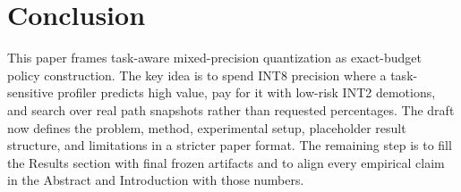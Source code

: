 \documentclass{article}
\newcommand{\inttwo}{INT2}
\newcommand{\inteight}{INT8}
\begin{document}
\section{Conclusion}

This paper frames task-aware mixed-precision quantization as exact-budget policy construction. The key idea is to spend \inteight{} precision where a task-sensitive profiler predicts high value, pay for it with low-risk \inttwo{} demotions, and search over real path snapshots rather than requested percentages. The draft now defines the problem, method, experimental setup, placeholder result structure, and limitations in a stricter paper format. The remaining step is to fill the Results section with final frozen artifacts and to align every empirical claim in the Abstract and Introduction with those numbers.
\end{document}
